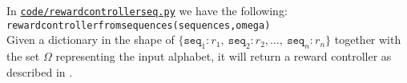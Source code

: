 In \href{https://gitlab.science.ru.nl/srietbergen/thesis/-/blob/master/code/reward_controller_seq.py}{\texttt{code/reward\textunderscore controller\textunderscore seq.py}} we have the following:\\

\texttt{reward\textunderscore controller\textunderscore from\textunderscore sequences(sequences,omega)}\\
Given a dictionary in the shape of $\{\texttt{seq}_1 : r_1,\:\texttt{seq}_2 : r_2,\dots,\: \texttt{seq}_n : r_n\}$ together with the set $\Omega$ representing the input alphabet, it will return a reward controller as described in .